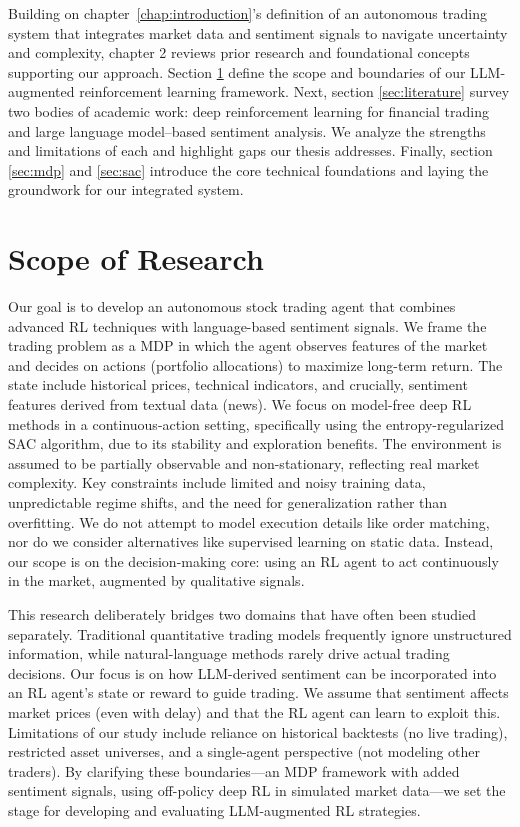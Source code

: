 Building on chapter \ref{chap:introduction}'s definition of an autonomous trading system that integrates market data and sentiment signals to navigate uncertainty and complexity, chapter 2 reviews prior research and foundational concepts supporting our approach. Section \ref{sec:scope} define the scope and boundaries of our \gls{LLM}-augmented reinforcement learning framework.  Next, section \ref{sec:literature} survey two bodies of academic work: deep reinforcement learning for financial trading and large language model–based sentiment analysis.  We analyze the strengths and limitations of each and highlight gaps our thesis addresses. Finally, section \ref{sec:mdp} and \ref{sec:sac} introduce the core technical foundations and laying the groundwork for our integrated system.

\section{Scope of Research}
\label{sec:scope}
Our goal is to develop an autonomous stock trading agent that combines advanced \gls{RL} techniques with language-based sentiment signals.  We frame the trading problem as a \gls{MDP} in which the agent observes features of the market and decides on actions (portfolio allocations) to maximize long-term return. The state include historical prices, technical indicators, and crucially, sentiment features derived from textual data (news).  We focus on model-free deep \gls{RL} methods in a continuous-action setting, specifically using the entropy-regularized \gls{SAC} algorithm, due to its stability and exploration benefits.  The environment is assumed to be partially observable and non-stationary, reflecting real market complexity. Key constraints include limited and noisy training data, unpredictable regime shifts, and the need for generalization rather than overfitting.  We do not attempt to model execution details like order matching, nor do we consider alternatives like supervised learning on static data.  Instead, our scope is on the decision-making core: using an RL agent to act continuously in the market, augmented by qualitative signals.

This research deliberately bridges two domains that have often been studied separately.  Traditional quantitative trading models frequently ignore unstructured information, while natural-language methods rarely drive actual trading decisions.  Our focus is on how \gls{LLM}-derived sentiment can be incorporated into an \gls{RL} agent's state or reward to guide trading.  We assume that sentiment affects market prices (even with delay) and that the \gls{RL} agent can learn to exploit this. Limitations of our study include reliance on historical backtests (no live trading), restricted asset universes, and a single-agent perspective (not modeling other traders). By clarifying these boundaries—an \gls{MDP} framework with added sentiment signals, using off-policy deep \gls{RL} in simulated market data—we set the stage for developing and evaluating \gls{LLM}-augmented RL strategies.

